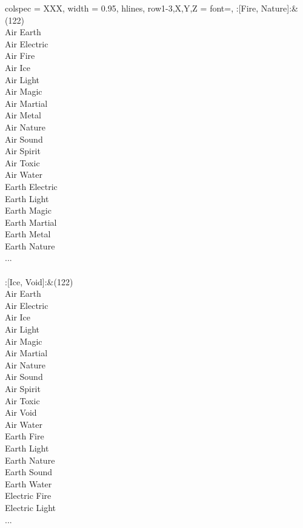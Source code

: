 \begin{longtblr}[
	caption = {2v2 Attacking Effective},
	label = {2v2-Attacking-Effective},
]{
	colspec = {XXX}, width = 0.95\linewidth,
	hlines,
	row{1-3,X,Y,Z} = {font=\bfseries},
}
	:[Fire, Nature]:&{(122)\\
	Air Earth \\
	Air Electric \\
	Air Fire \\
	Air Ice \\
	Air Light \\
	Air Magic \\
	Air Martial \\
	Air Metal \\
	Air Nature \\
	Air Sound \\
	Air Spirit \\
	Air Toxic \\
	Air Water \\
	Earth Electric \\
	Earth Light \\
	Earth Magic \\
	Earth Martial \\
	Earth Metal \\
	Earth Nature \\
	...\\
	}\\

	:[Ice, Void]:&{(122)\\
	Air Earth \\
	Air Electric \\
	Air Ice \\
	Air Light \\
	Air Magic \\
	Air Martial \\
	Air Nature \\
	Air Sound \\
	Air Spirit \\
	Air Toxic \\
	Air Void \\
	Air Water \\
	Earth Fire \\
	Earth Light \\
	Earth Nature \\
	Earth Sound \\
	Earth Water \\
	Electric Fire \\
	Electric Light \\
	...\\
	}\\


\end{longtblr}
